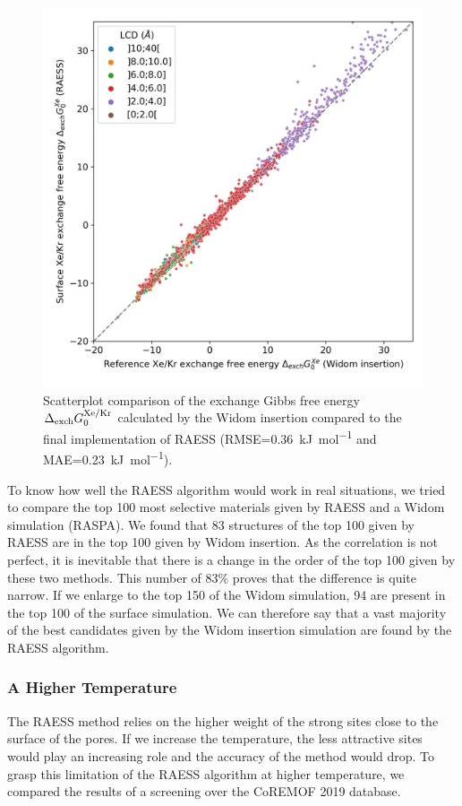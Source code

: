 \documentclass[main]{subfiles}
\begin{document}
\begin{figure}[ht]
\centering
  \includegraphics[width=0.5\linewidth]{figures/3-fastsim/G_XeKr_widom_vs_G_XeKr_surface_zoom.jpg}
  \caption{Scatterplot comparison of the exchange Gibbs free energy $\Delta_{\text{exch}}G_{\text{0}}^{\text{Xe/Kr}}$ calculated by the Widom insertion compared to the final implementation of RAESS (RMSE=\SI{0.36}{\kilo\joule\per\mole} and MAE=\SI{0.23}{\kilo\joule\per\mole}).}\label{fgr:exch_free_energy}
\end{figure}

To know how well the RAESS algorithm would work in real situations, we tried to compare the top 100 most selective materials given by RAESS and a Widom simulation (RASPA). We found that 83 structures of the top 100 given by RAESS are in the top 100 given by Widom insertion. As the correlation is not perfect, it is inevitable that there is a change in the order of the top 100 given by these two methods. This number of {83\%} proves that the difference is quite narrow. If we enlarge to the top 150 of the Widom simulation, 94 are present in the top 100 of the surface simulation. We can therefore say that a vast majority of the best candidates given by the Widom insertion simulation are found by the RAESS algorithm.


\subsubsection{A Higher Temperature}

The RAESS method relies on the higher weight of the strong sites close to the surface of the pores. If we increase the temperature, the less attractive sites would play an increasing role and the accuracy of the method would drop. To grasp this limitation of the RAESS algorithm at higher temperature, we compared the results of a screening over the CoREMOF 2019 database.  
\end{document}
